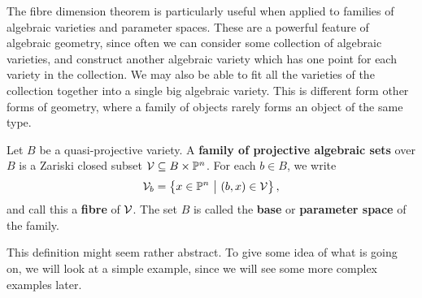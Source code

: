 The fibre dimension theorem is particularly useful when applied to families of algebraic varieties and parameter spaces. These are a powerful feature of algebraic geometry, since often we can consider some collection of algebraic varieties, and construct another algebraic variety which has one point for each variety in the collection. We may also be able to fit all the varieties of the collection together into a single big algebraic variety. This is different form other forms of geometry, where a family of objects rarely forms an object of the same type.

\pagebreak

\begin{definition*}
Let $ B $ be a quasi-projective variety. A \textbf{family of projective algebraic sets} over $ B $ is a Zariski closed subset $ \mathcal{V} \subseteq B \times \mathbb{P}^n $. For each $ b \in B $, we write
$$ \VVV_b = \cbr{x \in \PP^n \st \br{b, x} \in \VVV}, $$
and call this a \textbf{fibre} of $ \mathcal{V} $. The set $ B $ is called the \textbf{base} or \textbf{parameter space} of the family.
\end{definition*}

This definition might seem rather abstract. To give some idea of what is going on, we will look at a simple example, since we will see some more complex examples later.

